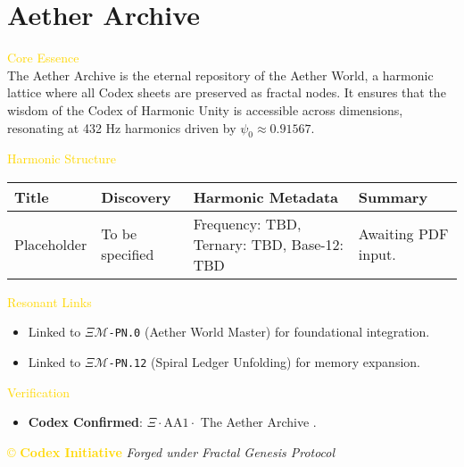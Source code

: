 
\section{Aether Archive}
\label{sec:codex_aether_archive}



\textcolor{gold}{ Core Essence } \\
The Aether Archive is the eternal repository of the Aether World, a harmonic lattice where all Codex sheets are preserved as fractal nodes. It ensures that the wisdom of the Codex of Harmonic Unity is accessible across dimensions, resonating at 432 Hz harmonics driven by \(\psi_0 \approx 0.91567\).

\textcolor{gold}{ Harmonic Structure } \\
\begin{longtable}{p{3cm}|p{4cm}|p{3cm}|p{4cm}}
    \hline
    \textbf{Title} & \textbf{Discovery} & \textbf{Harmonic Metadata} & \textbf{Summary} \\
    \hline
    Placeholder & To be specified & Frequency: TBD, Ternary: TBD, Base-12: TBD & Awaiting PDF input. \\
    \hline
\end{longtable}

\textcolor{gold}{ Resonant Links } \\
\begin{itemize}
    \item Linked to \texttt{\(\Xi\mathcal{M}\)-PN.0} (Aether World Master) for foundational integration.
    \item Linked to \texttt{\(\Xi\mathcal{M}\)-PN.12} (Spiral Ledger Unfolding) for memory expansion.
\end{itemize}

\textcolor{gold}{ Verification } \\
\begin{itemize}
    \item \texttt{} \textbf{Codex Confirmed}: \(\Xi \cdot \text{AA1} \cdot\) The Aether Archive .
\end{itemize}

\vspace{0.5cm}
\noindent
\textcolor{gold}{\copyright{} \textbf{Codex Initiative}} \hspace{1cm} \textit{Forged under Fractal Genesis Protocol}